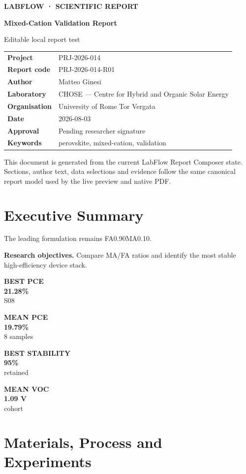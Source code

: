 \documentclass[10pt,a4paper]{article}
\newcommand{\metric}[3]{\begin{minipage}[t]{0.18\linewidth}\textcolor{LabAccent}{\scriptsize\bfseries #1}\\[-1pt]{\Large\bfseries #2}\\[-1pt]{\scriptsize #3}\end{minipage}}
\begin{document}
\begin{titlepage}
\color{LabDark}
{\small\bfseries\textcolor{LabAccent}{LABFLOW · SCIENTIFIC REPORT}}\par
\vspace{22mm}
{\Huge\bfseries Mixed-Cation Validation Report\par}
\vspace{3mm}
{\Large\color{LabAccent}Editable local report test\par}
\vspace{14mm}
\begin{tabularx}{\linewidth}{@{}>{\bfseries}lX@{}}
Project & PRJ-2026-014\\
Report code & PRJ-2026-014-R01\\
Author & Matteo Ginesi\\
Laboratory & CHOSE — Centre for Hybrid and Organic Solar Energy\\
Organisation & University of Rome Tor Vergata\\
Date & 2026-08-03\\
Approval & Pending researcher signature\\
Keywords & perovskite, mixed-cation, validation\\
\end{tabularx}
\vfill
\colorbox{LabSoft}{\parbox{0.95\linewidth}{\small This document is generated from the current LabFlow Report Composer state. Sections, author text, data selections and evidence follow the same canonical report model used by the live preview and native PDF.}}
\end{titlepage}

\section{Executive Summary}

The leading formulation remains FA0.90MA0.10.

\textbf{Research objectives.} Compare MA/FA ratios and identify the most stable high-efficiency device stack.

\begin{center}
\metric{BEST PCE}{21.28\%}{S08}
\hfill\metric{MEAN PCE}{19.79\%}{8 samples}
\hfill\metric{BEST STABILITY}{95\%}{retained}
\hfill\metric{MEAN VOC}{1.09 V}{cohort}
\end{center}

\section{Materials, Process and Experiments}
\end{document}
